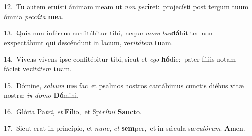 {\numbfont\textcolor{\numbcolor}{12.}}~Tu autem eruísti ánimam meam ut \textit{non} \textit{per}\-\textbf{í}ret:~\star projecísti post tergum tuum ómnia \textit{pec}\-\textit{cá}\textit{ta} \textbf{me}\-a.\par
{\numbfont\textcolor{\numbcolor}{13.}}~Quia non inférnus confitébitur tibi,~\dagger neque \textit{mors} \textit{lau}\-\textbf{dá}bit te:~\star non exspectábunt qui descéndunt in lacum, ve\-\textit{ri}\-\textit{tá}\textit{tem} \textbf{tu}\-am.\par
{\numbfont\textcolor{\numbcolor}{14.}}~Vivens vivens ipse confitébitur tibi, sicut et \textit{e}\-\textit{go} \textbf{hó}\-die:~\star pater fíliis notam fáciet ve\-\textit{ri}\-\textit{tá}\textit{tem} \textbf{tu}\-am.\par
{\numbfont\textcolor{\numbcolor}{15.}}~Dómine, \textit{sal}\-\textit{vum} \textbf{me} fac~\star et psalmos nostros cantábimus cunctis diébus vitæ nostræ \textit{in} \textit{do}\-\textit{mo} \textbf{Dó}\-mini.\par
{\numbfont\textcolor{\numbcolor}{16.}}~Glória Pa\-\textit{tri}\-, \textit{et} \textbf{Fí}\-lio,~\star et Spi\-\textit{rí}\-\textit{tu}\textit{i} \textbf{Sanc}\-to.\par
{\numbfont\textcolor{\numbcolor}{17.}}~Sicut erat in princípio, et \textit{nunc}\-, \textit{et} \textbf{sem}\-per,~\star et in sǽcula sæ\-\textit{cu}\-\textit{ló}\textit{rum}. \textbf{A}\-men.\par
